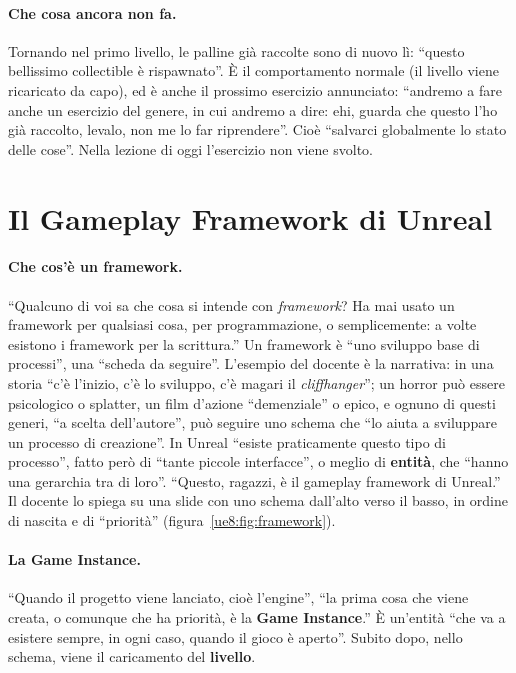 \paragraph{Che cosa ancora non fa.} Tornando nel primo livello, le palline già raccolte
sono di nuovo lì: ``questo bellissimo collectible è rispawnato''. È il comportamento
normale (il livello viene ricaricato da capo), ed è anche il prossimo esercizio
annunciato: ``andremo a fare anche un esercizio del genere, in cui andremo a dire: ehi,
guarda che questo l'ho già raccolto, levalo, non me lo far riprendere''. Cioè
``salvarci globalmente lo stato delle cose''. Nella lezione di oggi l'esercizio non viene
svolto.

\section{Il Gameplay Framework di Unreal}
\label{ue8:sec:framework}

\paragraph{Che cos'è un framework.} ``Qualcuno di voi sa che cosa si intende con
\emph{framework}? Ha mai usato un framework per qualsiasi cosa, per programmazione, o
semplicemente: a volte esistono i framework per la scrittura.'' Un framework è ``uno
sviluppo base di processi'', una ``scheda da seguire''. L'esempio del docente è la
narrativa: in una storia ``c'è l'inizio, c'è lo sviluppo, c'è magari il
\emph{cliffhanger}''; un horror può essere psicologico o splatter, un film d'azione
``demenziale'' o epico, e ognuno di questi generi, ``a scelta dell'autore'', può seguire
uno schema che ``lo aiuta a sviluppare un processo di creazione''. In Unreal ``esiste
praticamente questo tipo di processo'', fatto però di ``tante piccole interfacce'', o
meglio di \textbf{entità}, che ``hanno una gerarchia tra di loro''. ``Questo, ragazzi, è
il gameplay framework di Unreal.'' Il docente lo spiega su una slide con uno schema
dall'alto verso il basso, in ordine di nascita e di ``priorità''
(figura~\ref{ue8:fig:framework}).

\paragraph{La Game Instance.} ``Quando il progetto viene lanciato, cioè l'engine'', ``la
prima cosa che viene creata, o comunque che ha priorità, è la \textbf{Game Instance}.''
È un'entità ``che va a esistere sempre, in ogni caso, quando il gioco è aperto''. Subito
dopo, nello schema, viene il caricamento del \textbf{livello}.

